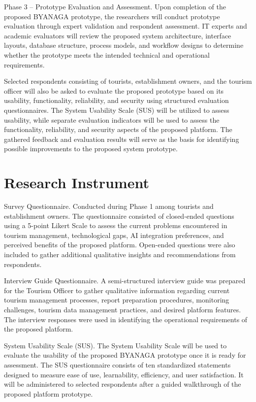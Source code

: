 \documentclass{research}
\begin{document}
Phase 3 -- Prototype Evaluation and Assessment. Upon completion of the 
proposed BYANAGA prototype, the researchers will conduct prototype 
evaluation through expert validation and respondent assessment. IT experts 
and academic evaluators will review the proposed system architecture, 
interface layouts, database structure, process models, and workflow designs 
to determine whether the prototype meets the intended technical and 
operational requirements.

Selected respondents consisting of tourists, establishment owners, and the 
tourism officer will also be asked to evaluate the proposed prototype based 
on its usability, functionality, reliability, and security using structured 
evaluation questionnaires. The System Usability Scale (SUS) will be utilized 
to assess usability, while separate evaluation indicators will be used to 
assess the functionality, reliability, and security aspects of the proposed 
platform. The gathered feedback and evaluation results will serve as the 
basis for identifying possible improvements to the proposed system prototype.

\section{Research Instrument}

Survey Questionnaire. Conducted during Phase 1 among tourists and 
establishment owners. The questionnaire consisted of closed-ended questions 
using a 5-point Likert Scale to assess the current problems encountered in 
tourism management, technological gaps, AI integration preferences, and 
perceived benefits of the proposed platform. Open-ended questions were also 
included to gather additional qualitative insights and recommendations from 
respondents.

Interview Guide Questionnaire. A semi-structured interview guide was 
prepared for the Tourism Officer to gather qualitative information regarding 
current tourism management processes, report preparation procedures, 
monitoring challenges, tourism data management practices, and desired 
platform features. The interview responses were used in identifying the 
operational requirements of the proposed platform.

System Usability Scale (SUS). The System Usability Scale will be used to 
evaluate the usability of the proposed BYANAGA prototype once it is ready 
for assessment. The SUS questionnaire consists of ten standardized 
statements designed to measure ease of use, learnability, efficiency, and 
user satisfaction. It will be administered to selected respondents after a 
guided walkthrough of the proposed platform prototype.
\end{document}
